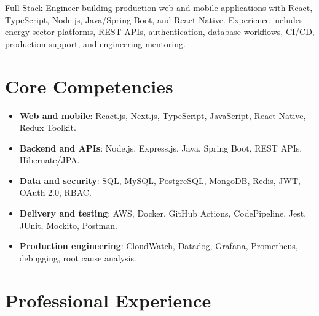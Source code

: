 \documentclass[11pt,a4paper,sans]{moderncv}
\begin{document}
\makecvtitle


\vspace{6pt}
{\small Full Stack Engineer building production web and mobile applications with React, TypeScript, Node.js, Java/Spring Boot, and React Native. Experience includes energy-sector platforms, REST APIs, authentication, database workflows, CI/CD, production support, and engineering mentoring.\par}


\section{Core Competencies}
\vspace{1pt}
\begin{itemize}

\item \textbf{Web and mobile}: React.js, Next.js, TypeScript, JavaScript, React Native, Redux Toolkit.

\item \textbf{Backend and APIs}: Node.js, Express.js, Java, Spring Boot, REST APIs, Hibernate/JPA.

\item \textbf{Data and security}: SQL, MySQL, PostgreSQL, MongoDB, Redis, JWT, OAuth 2.0, RBAC.

\item \textbf{Delivery and testing}: AWS, Docker, GitHub Actions, CodePipeline, Jest, JUnit, Mockito, Postman.

\item \textbf{Production engineering}: CloudWatch, Datadog, Grafana, Prometheus, debugging, root cause analysis.

\end{itemize}


\section{Professional Experience}
\vspace{3pt}
\end{document}
